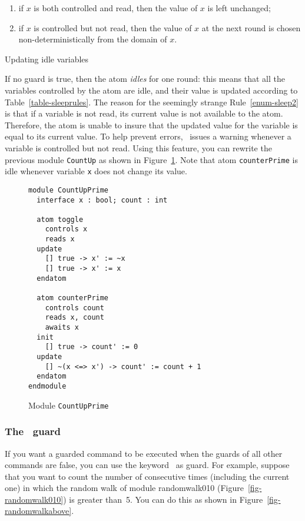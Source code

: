 {\begin{table}
{\begin{enumerate}
\item if $x$ is both controlled and read, then the value of $x$ is
left unchanged;

\item \label{enum-sleep2} 
if $x$ is controlled but not read, then the value of $x$ at the
next round is chosen non-deterministically from the domain of $x$. 

\end{enumerate}}
\caption{Updating idle variables}
\label{table-sleeprules}
\end{table}

If no guard is true, then the atom {\em idles\/} for
one round: this means that all the variables controlled by the atom
are idle, and their value is updated according
to Table~\ref{table-sleeprules}.  The reason for the seemingly strange
Rule~\ref{enum-sleep2} is that if a variable is not read, its current
value is not available to the atom.  Therefore, the atom is unable to
insure that the updated value for the variable is equal to its current
value.  To help prevent errors, \mocha\ issues a warning whenever a
variable is controlled but not read.  Using this feature, you can
rewrite the previous module {\tt CountUp} as shown in
Figure~\ref{fig-countupprime}. 
Note that atom {\tt counterPrime} is idle whenever variable {\tt x}
does not change its value. 

\begin{figure}
\begin{verbatim}
module CountUpPrime
  interface x : bool; count : int

  atom toggle 
    controls x
    reads x
  update 
    [] true -> x' := ~x 
    [] true -> x' := x 
  endatom

  atom counterPrime
    controls count
    reads x, count
    awaits x
  init
    [] true -> count' := 0
  update
    [] ~(x <=> x') -> count' := count + 1
  endatom
endmodule 
\end{verbatim}
\caption{Module {\tt CountUpPrime}}
\label{fig-countupprime}
\end{figure}



\subsubsection{The \DEFAULT\ guard}
\label{sec-default}

If you want a guarded command to be executed when the guards of all
other commands are false, you can use the keyword \DEFAULT\ as
guard. For example, suppose that you want to count the number of
consecutive times (including the current one) in which the random walk
of module {\sc randomwalk010} (Figure~\ref{fig-randomwalk010}) is
greater than~5.  You can do this as shown in
Figure~\ref{fig-randomwalkabove}. 

}
